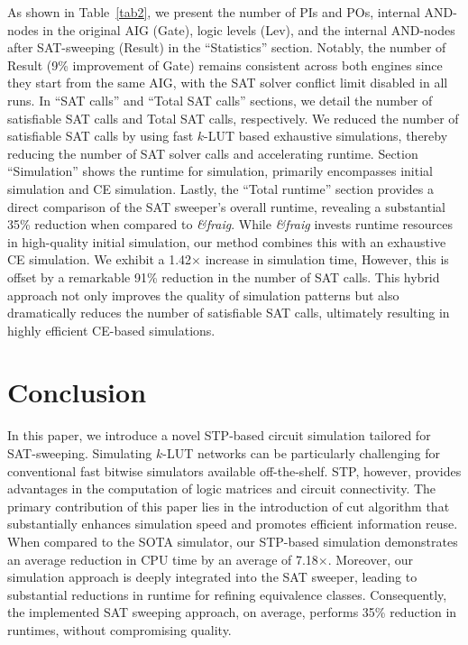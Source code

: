 \documentclass[conference]{IEEEtran}
\begin{document}
As shown in Table~\ref{tab2}, we present the number of PIs and POs, internal AND-nodes in the original AIG (Gate), logic levels (Lev), and the internal AND-nodes after SAT-sweeping (Result) in the ``Statistics'' section.
Notably, the number of Result (9\% improvement of Gate) remains consistent across both engines since they start from the same AIG, with the SAT solver conflict limit disabled in all runs.
In ``SAT calls'' and ``Total SAT calls'' sections, we detail the number of satisfiable SAT calls and Total SAT calls, respectively.
We reduced the number of satisfiable SAT calls by using fast $k$-LUT based exhaustive simulations, thereby reducing the number of SAT solver calls and accelerating runtime.
Section ``Simulation'' shows the runtime for simulation, primarily encompasses initial simulation and CE simulation.
Lastly, the ``Total runtime'' section provides a direct comparison of the SAT sweeper's overall runtime, revealing a substantial 35\% reduction when compared to \emph{\&fraig}. 
While \emph{\&fraig} invests runtime resources in high-quality initial simulation, our method combines this with an exhaustive CE simulation. 
We exhibit a 1.42$\times$ increase in simulation time, However, this is offset by a remarkable 91\% reduction in the number of SAT calls.
This hybrid approach not only improves the quality of simulation patterns but also dramatically reduces the number of satisfiable SAT calls, ultimately resulting in highly efficient CE-based simulations.

\vspace{-2mm}
\section{Conclusion}
\label{sec7}
In this paper, we introduce a novel STP-based circuit simulation tailored for SAT-sweeping. 
Simulating $k$-LUT networks can be particularly challenging for conventional fast bitwise simulators available off-the-shelf. 
STP, however, provides advantages in the computation of logic matrices and circuit connectivity.
The primary contribution of this paper lies in the introduction of cut algorithm that substantially enhances simulation speed and promotes efficient information reuse. 
When compared to the SOTA simulator, our STP-based simulation demonstrates an average reduction in CPU time by an average of 7.18$\times$.
Moreover, our simulation approach is deeply integrated into the SAT sweeper, leading to substantial reductions in runtime for refining equivalence classes. 
Consequently, the implemented SAT sweeping approach, on average, performs 35\% reduction in runtimes, without compromising quality.
\end{document}

